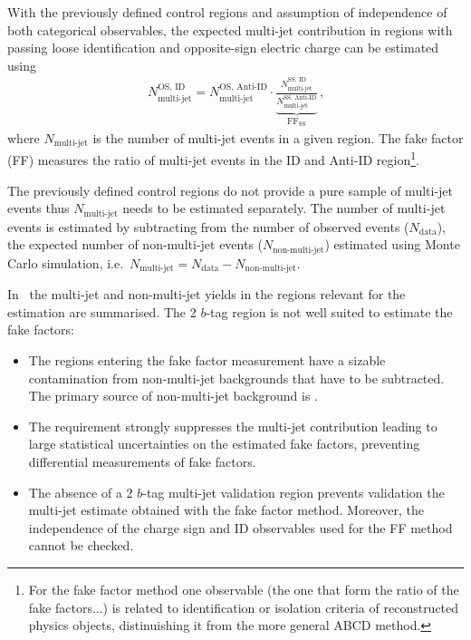 With the previously defined control regions and assumption of
independence of both categorical observables, the expected multi-jet
contribution in regions with \tauhadvis passing loose identification
and opposite-sign electric charge can be estimated using
\begin{align*}
  N_\text{multi-jet}^{\text{OS, ID}} =
  N_\text{multi-jet}^{\text{OS, Anti-ID}}
  \cdot
  \underbrace{\frac{N_\text{multi-jet}^{\text{SS, ID}}}
                   {N_\text{multi-jet}^{\text{SS, Anti-ID}}}}
  _{\text{FF}_\text{SS}} \,\text{,}
  \label{eq:ff_method}
\end{align*}
where $N_\text{multi-jet}$ is the number of multi-jet events in a
given region. The fake factor (FF) measures the ratio of multi-jet
events in the ID and Anti-ID region\footnote{For the fake factor
  method one observable (the one that form the ratio of the fake
  factors...) is related to identification or isolation criteria of
  reconstructed physics objects, distinuishing it from the more
  general ABCD method.}. 

The previously defined control regions do not provide a pure sample of
multi-jet events thus $N_\text{multi-jet}$ needs to be estimated
separately. The number of multi-jet events is estimated by subtracting
from the number of observed events ($N_\text{data}$), the expected
number of non-multi-jet events ($N_\text{non-multi-jet}$) estimated
using Monte Carlo simulation, i.e.\
$N_\text{multi-jet} = N_\text{data} - N_\text{non-multi-jet}$.

In~ the multi-jet and non-multi-jet yields in
the regions relevant for the \faketauhadvis estimation are
summarised. The 2 $b$-tag region is not well suited to estimate the
fake factors:
\begin{itemize}
\item The regions entering the fake factor measurement have a sizable
  contamination from non-multi-jet backgrounds that have to be
  subtracted. The primary source of non-multi-jet background is
  \ttbarFakes.

\item The \btag requirement strongly suppresses the multi-jet
  contribution leading to large statistical uncertainties on the
  estimated fake factors, preventing differential measurements of fake
  factors.

\item The absence of a 2 $b$-tag multi-jet validation region prevents
  validation the multi-jet estimate obtained with the fake factor
  method. Moreover, the independence of the charge sign and ID
  observables used for the FF method cannot be checked.
\end{itemize}

